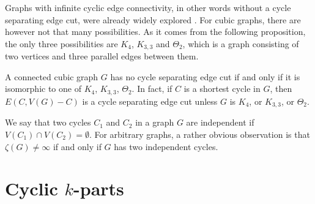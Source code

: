 Graphs with infinite cyclic edge connectivity, in other words without a cycle separating edge cut, were already widely explored \cite{atoms-of-cyclic, Lou2008, lovasz1965graphs}. For cubic graphs, there are however not that many possibilities. As it comes from the following proposition, the only three possibilities are $K_4$, $K_{3,3}$ and $\Theta_2$, which is a graph consisting of two vertices and three parallel edges between them.

\begin{proposition}
	A connected cubic graph $G$ has no cycle separating edge cut if and only if it is isomorphic to one of $K_4$, $K_{3,3}$, $\Theta_2$. In fact, if $C$ is a shortest cycle in $G$, then $E(C,V(G)-C)$ is a cycle separating edge cut unless $G$ is $K_4$, or $K_{3,3}$, or $\Theta_2$.
\end{proposition}

We say that two cycles $C_1$ and $C_2$ in a graph $G$ are independent if $V(C_1)\cap V(C_2) = \emptyset$. For arbitrary graphs, a rather obvious observation is that $\zeta(G)\neq\infty$ if and only if $G$ has two independent cycles.


\section{Cyclic $k$-parts}\label{sec:cyclic-k-parts}